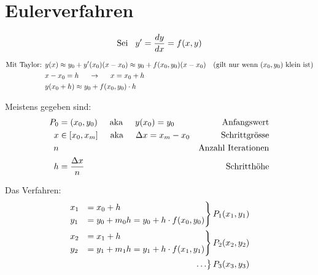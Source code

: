 \section{Eulerverfahren}

\begin{equation*}
    \textrm{Sei}\hspace{3mm} y' = \frac{dy}{dx} = f(x, y)
\end{equation*}

\begin{align*}
    \textrm{Mit Taylor: } &  y(x)\approx y_0 + y'(x_0)(x-x_0) \approx y_0 + f(x_0,y_0)(x-x_0) & \textrm{(gilt nur wenn $(x_0,y_0)$ klein ist)} \\
                          & x-x_0 = h \hspace{5mm}\rightarrow\hspace{5mm} x = x_0 + h & \\
                          & y(x_0 + h) \approx y_0 + f(x_0,y_0) \cdot h & \\
\end{align*}

Meistens gegeben sind:
\begin{align*}
    P_0 &= (x_0,y_0) \hspace{5mm}\textrm{aka}\hspace{5mm} y(x_0)=y_0             & \textrm{Anfangswert} \\
    x   &\in [x_0, x_m] \hspace{5mm}\textrm{aka}\hspace{5mm} \Delta x=x_m-x_0    & \textrm{Schrittgr\"osse}\\
    n   &                                                  & \textrm{Anzahl Iterationen}\\
    h   &= \frac{\Delta x}{n}                              & \textrm{Schritth\"ohe}\\
\end{align*}

Das Verfahren:
\begin{align*}
    \begin{rcases}
        x_1 &= x_0 + h \\
        y_1 &= y_0 + m_0 h = y_0 + h\cdot f(x_0,y_0) \\
    \end{rcases} P_1(x_1,y_1) \\
    \begin{rcases}
        x_2 &= x_1 + h \\
        y_2 &= y_1 + m_1 h = y_1 + h\cdot f(x_1,y_1) \\
    \end{rcases} P_2(x_2,y_2) \\
    \begin{rcases}
        \ldots \\
    \end{rcases} P_3(x_3,y_3) \\
\end{align*}

